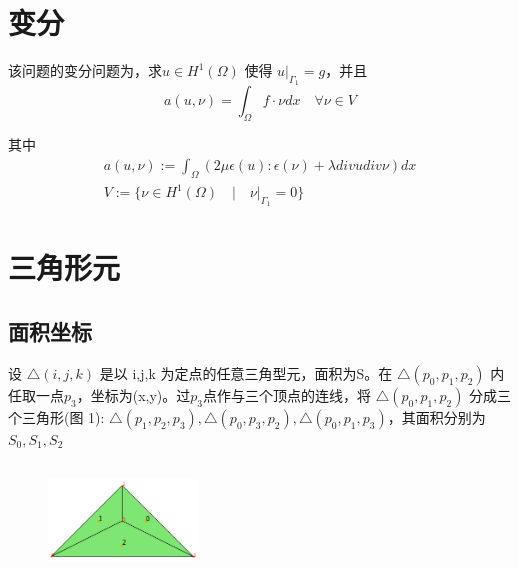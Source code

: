 \documentclass[UTF8,titlepage,twocolumn]{ctexart}
\begin{document}
\section{变分}

该问题的变分问题为，求$u \in H^1(\Omega)$ 使得 $u |_{\Gamma_1} = g$，并且
$$
	a(u,\nu) = \int_{\Omega} f \cdot \nu dx \quad \forall \nu \in V
$$ 
\par
其中
$$
	\begin{matrix}
		a(u,\nu) := \int_{\Omega} (2 \mu \epsilon(u) : \epsilon(\nu) + \lambda div u div \nu) dx 
		\\  
		V := \{ \nu \in H^1(\Omega) \quad | \quad \nu |_{\Gamma_1} = 0 \}
	\end{matrix}
$$

\section{三角形元}

\subsection{面积坐标}

设 $ \bigtriangleup(i,j,k) $ 是以 i,j,k 为定点的任意三角型元，面积为S。在 $ \bigtriangleup (p_0,p_1,p_2) $ 内任取一点$p_3$，坐标为(x,y)。过$p_3$点作与三个顶点的连线，将 $ \bigtriangleup(p_0,p_1,p_2) $ 分成三个三角形(图 1): $ \bigtriangleup(p_1,p_2,p_3), \bigtriangleup(p_0,p_3,p_2), \bigtriangleup(p_0,p_1,p_3) $，其面积分别为$S_0,S_1,S_2$

\begin{figure}[hb]
	\centering
	\includegraphics[height=3cm,width=4cm]{../image/TriangleElement.png}
	\caption{}
	\label{SampleOfDatasets}
\end{figure}
\end{document}
